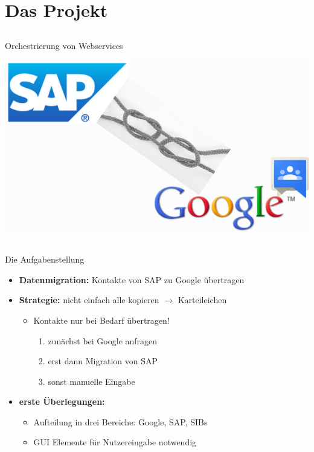 \section{Das Projekt}

\subsection*{}
\begin{frame}{Orchestrierung von Webservices}
	
\begin{center}
\includegraphics[width=\textheight]{Bilder/titel_einfuehrung_logos.png} 
\end{center}

\end{frame}

\subsection*{}
\begin{frame}{Die Aufgabenstellung}
\begin{itemize}
	\item \textbf{Datenmigration:} Kontakte von SAP zu Google übertragen
	\pause
	\item \textbf{Strategie:} nicht einfach alle kopieren $\rightarrow$ Karteileichen
		\begin{itemize}
			\item Kontakte nur bei Bedarf übertragen!
			\pause
			\begin{enumerate}
				\item zunächst bei Google anfragen
				\item erst dann Migration von SAP
				\item sonst manuelle Eingabe
			\end{enumerate}
		\end{itemize}
	\pause
	\item \textbf{erste Überlegungen:}
		\begin{itemize}
			\item Aufteilung in drei Bereiche: Google, SAP, SIBs
			\item GUI Elemente für Nutzereingabe notwendig
		\end{itemize}

\end{itemize}
\end{frame}



